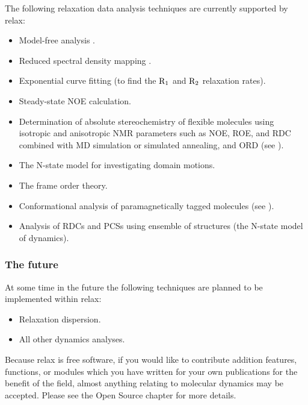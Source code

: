 The following relaxation data analysis techniques are currently supported by relax:

\begin{itemize}
\item Model-free analysis \citep{LipariSzabo82a, LipariSzabo82b, Clore90a}.
\item Reduced spectral density mapping \citep{Farrow95, Lefevre96}.
\item Exponential curve fitting (to find the $\mathrm{R}_1$ and $\mathrm{R}_2$ relaxation rates).
\item Steady-state NOE calculation.
\item Determination of absolute stereochemistry of flexible molecules using isotropic and anisotropic NMR parameters such as NOE, ROE, and RDC combined with MD simulation or simulated annealing, and ORD (see \citet{Sun11}).
\item The N-state model for investigating domain motions.
\item The frame order theory.
\item Conformational analysis of paramagnetically tagged molecules (see \citet{Erdelyi11}).
\item Analysis of RDCs and PCSs using ensemble of structures (the N-state model of dynamics).
\end{itemize}


\subsubsection{The future}

At some time in the future the following techniques are planned to be implemented within relax:

\begin{itemize}
\item Relaxation dispersion.
\item All other dynamics analyses.
\end{itemize}

Because relax is free software, if you would like to contribute addition features, functions, or modules which you have written for your own publications for the benefit of the field, almost anything relating to molecular dynamics may be accepted.  Please see the Open Source chapter for more details.




